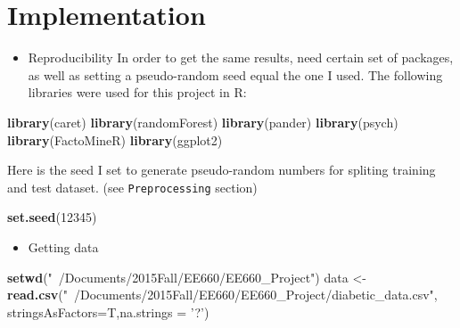 \documentclass[]{article}
\newenvironment{Shaded}{\begin{snugshade}}{\end{snugshade}}
\newcommand{\KeywordTok}[1]{\textcolor[rgb]{0.13,0.29,0.53}{\textbf{{#1}}}}
\newcommand{\DataTypeTok}[1]{\textcolor[rgb]{0.13,0.29,0.53}{{#1}}}
\newcommand{\DecValTok}[1]{\textcolor[rgb]{0.00,0.00,0.81}{{#1}}}
\newcommand{\StringTok}[1]{\textcolor[rgb]{0.31,0.60,0.02}{{#1}}}
\newcommand{\NormalTok}[1]{{#1}}
\begin{document}
\section{Implementation}\label{implementation}

\begin{itemize}
\itemsep1pt\parskip0pt
\item
  Reproducibility In order to get the same results, need certain set of
  packages, as well as setting a pseudo-random seed equal the one I
  used. The following libraries were used for this project in R:
\end{itemize}

\begin{Shaded}
\begin{Highlighting}[]
\KeywordTok{library}\NormalTok{(caret)}
\KeywordTok{library}\NormalTok{(randomForest)}
\KeywordTok{library}\NormalTok{(pander)}
\KeywordTok{library}\NormalTok{(psych)}
\KeywordTok{library}\NormalTok{(FactoMineR)}
\KeywordTok{library}\NormalTok{(ggplot2)}
\end{Highlighting}
\end{Shaded}

Here is the seed I set to generate pseudo-random numbers for spliting
training and test dataset. (see \texttt{Preprocessing} section)

\begin{Shaded}
\begin{Highlighting}[]
\KeywordTok{set.seed}\NormalTok{(}\DecValTok{12345}\NormalTok{)}
\end{Highlighting}
\end{Shaded}

\begin{itemize}
\itemsep1pt\parskip0pt
\item
  Getting data
\end{itemize}

\begin{Shaded}
\begin{Highlighting}[]
\KeywordTok{setwd}\NormalTok{(}\StringTok{"~/Documents/2015Fall/EE660/EE660_Project"}\NormalTok{)}
\NormalTok{data <-}\StringTok{ }\KeywordTok{read.csv}\NormalTok{(}\StringTok{"~/Documents/2015Fall/EE660/EE660_Project/diabetic_data.csv"}\NormalTok{,}
                 \DataTypeTok{stringsAsFactors=}\NormalTok{T,}\DataTypeTok{na.strings =} \StringTok{'?'}\NormalTok{)}
\end{Highlighting}
\end{Shaded}
\end{document}

